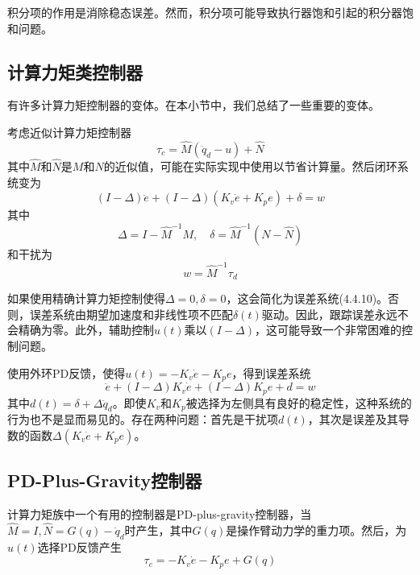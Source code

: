 \documentclass[UTF8]{ctexart}
\theoremstyle{definition}
\begin{document}
积分项的作用是消除稳态误差。然而，积分项可能导致执行器饱和引起的积分器饱和问题。

\subsection{计算力矩类控制器}

有许多计算力矩控制器的变体。在本小节中，我们总结了一些重要的变体。

考虑近似计算力矩控制器
\begin{equation}
    \tau_c = \hat{M}(\ddot{q}_d - u) + \hat{N}
\end{equation}
其中$\hat{M}$和$\hat{N}$是$M$和$N$的近似值，可能在实际实现中使用以节省计算量。然后闭环系统变为
\begin{equation}
    (I - \Delta)\ddot{e} + (I - \Delta)(K_v\dot{e} + K_pe) + \delta = w
\end{equation}
其中
\begin{equation}
    \Delta = I - \hat{M}^{-1}M, \quad \delta = \hat{M}^{-1}(N - \hat{N})
\end{equation}
和干扰为
\begin{equation}
    w = \hat{M}^{-1}\tau_d
\end{equation}

如果使用精确计算力矩控制使得$\Delta = 0, \delta = 0$，这会简化为误差系统(4.4.10)。否则，误差系统由期望加速度和非线性项不匹配$\delta(t)$驱动。因此，跟踪误差永远不会精确为零。此外，辅助控制$u(t)$乘以$(I - \Delta)$，这可能导致一个非常困难的控制问题。

使用外环PD反馈，使得$u(t) = -K_v\dot{e} - K_pe$，得到误差系统
\begin{equation}
    \ddot{e} + (I - \Delta)K_v\dot{e} + (I - \Delta)K_pe + d = w
\end{equation}
其中$d(t) = \delta + \Delta\ddot{q}_d$。即使$K_v$和$K_p$被选择为左侧具有良好的稳定性，这种系统的行为也不是显而易见的。存在两种问题：首先是干扰项$d(t)$，其次是误差及其导数的函数$\Delta(K_v\dot{e} + K_pe)$。

\subsection{PD-Plus-Gravity控制器}

计算力矩族中一个有用的控制器是PD-plus-gravity控制器，当$\hat{M} = I, \hat{N} = G(q) - \ddot{q}_d$时产生，其中$G(q)$是操作臂动力学的重力项。然后，为$u(t)$选择PD反馈产生
\begin{equation}
    \tau_c = -K_v\dot{e} - K_pe + G(q)
\end{equation}
\end{document}
